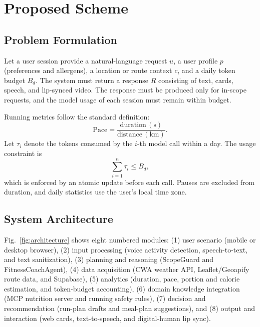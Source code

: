 \section{Proposed Scheme}\label{sec:method}
\subsection{Problem Formulation}
Let a user session provide a natural-language request $u$, a user profile $p$ (preferences and allergens), a location or route context $c$, and a daily token budget $B_d$. The system must return a response $R$ consisting of text, cards, speech, and lip-synced video. The response must be produced only for in-scope requests, and the model usage of each session must remain within budget.

Running metrics follow the standard definition:
\begin{equation}
\mathrm{Pace} = \frac{\mathrm{duration}\,(\mathrm{s})}{\mathrm{distance}\,(\mathrm{km})}.
\label{eq:pace}
\end{equation}
Let $\tau_i$ denote the tokens consumed by the $i$-th model call within a day. The usage constraint is
\begin{equation}
\sum_{i=1}^{n}\tau_i \le B_d,
\label{eq:budget}
\end{equation}
which is enforced by an atomic update before each call. Pauses are excluded from duration, and daily statistics use the user's local time zone.

\subsection{System Architecture}
Fig.~\ref{fig:architecture} shows eight numbered modules: (1) user scenario (mobile or desktop browser), (2) input processing (voice activity detection, speech-to-text, and text sanitization), (3) planning and reasoning (ScopeGuard and FitnessCoachAgent), (4) data acquisition (CWA weather API, Leaflet/Geoapify route data, and Supabase), (5) analytics (duration, pace, portion and calorie estimation, and token-budget accounting), (6) domain knowledge integration (MCP nutrition server and running safety rules), (7) decision and recommendation (run-plan drafts and meal-plan suggestions), and (8) output and interaction (web cards, text-to-speech, and digital-human lip sync).


